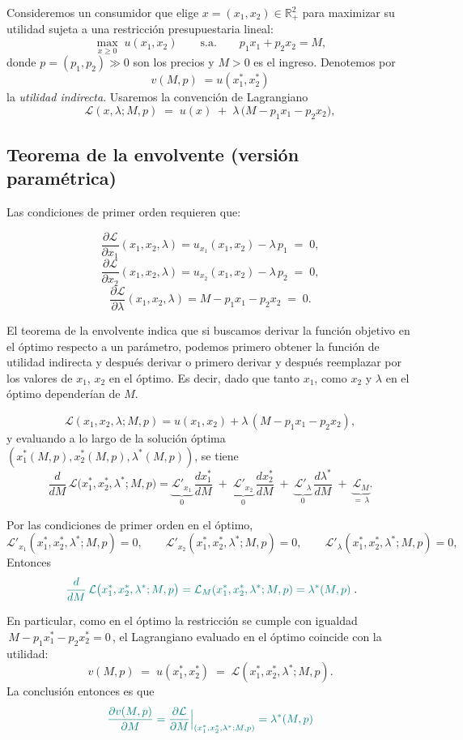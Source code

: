\documentclass{article}
\begin{document}
Consideremos un consumidor que elige \(x=(x_1,x_2)\in\mathbb{R}^2_+\) para maximizar su utilidad sujeta a una restricción presupuestaria lineal:
\[
\max_{x\ge 0}\; u(x_1,x_2)
\qquad\text{s.a.}\qquad
p_1 x_1 + p_2 x_2 = M,
\]
donde \(p=(p_1,p_2)\gg 0\) son los precios y \(M>0\) es el ingreso. Denotemos por
\[
v(M,p)\;= u(x_1^*,x_2^*)
\]
la \emph{utilidad indirecta}. Usaremos la convención de Lagrangiano
\[
\mathcal L(x,\lambda;M,p)
\;=\;
u(x)\;+\;\lambda\,\bigl(M - p_1x_1-p_2x_2),
\]

\subsection*{Teorema de la envolvente (versión paramétrica)}
Las condiciones de primer orden requieren que:

\[
\frac{\partial \mathcal L}{\partial x_1}(x_1,x_2,\lambda)
= u_{x_1}(x_1,x_2) - \lambda\,p_1 \;=\; 0,
\]
\[
\frac{\partial \mathcal L}{\partial x_2}(x_1,x_2,\lambda)
= u_{x_2}(x_1,x_2) - \lambda\,p_2 \;=\; 0,
\]
\[
\frac{\partial \mathcal L}{\partial \lambda}(x_1,x_2,\lambda)
= M - p_1 x_1 - p_2 x_2 \;=\; 0.
\]


El teorema de la envolvente indica que si buscamos derivar la función objetivo en el óptimo respecto a un parámetro, podemos primero obtener la función de utilidad indirecta y después derivar o primero derivar y después reemplazar por los valores de $x_1$, $x_2$ en el óptimo. Es decir, dado que tanto $x_1$, como $x_2$ y $\lambda$ en el óptimo dependerían de $M$.

\[
\mathcal L(x_1,x_2,\lambda;M,p)=u(x_1,x_2)+\lambda\,(M-p_1x_1-p_2x_2),
\]
y evaluando a lo largo de la solución óptima \((x_1^*(M,p),x_2^*(M,p),\lambda^*(M,p))\), se tiene
\[
\frac{d}{dM}\,\mathcal L\bigl(x_1^*,x_2^*,\lambda^*;M,p\bigr)
=
\underbrace{\mathcal L'_{x_1}}_{0}\,\frac{dx_1^*}{dM}
\;+\;
\underbrace{\mathcal L'_{x_2}}_{0}\,\frac{dx_2^*}{dM}
\;+\;
\underbrace{\mathcal L'_{\lambda}}_{0}\,\frac{d\lambda^*}{dM}
\;+\;
\underbrace{\mathcal L_{M}}_{=\,\lambda}.
\]

Por las condiciones de primer orden en el óptimo,
\[
\mathcal L'_{x_1}(x_1^*,x_2^*,\lambda^*;M,p)=0,\qquad
\mathcal L'_{x_2}(x_1^*,x_2^*,\lambda^*;M,p)=0,\qquad
\mathcal L'_{\lambda}(x_1^*,x_2^*,\lambda^*;M,p)=0,
\]
Entonces
\[
{\color{teal}\;
\frac{d}{dM}\,\mathcal L\bigl(x_1^*,x_2^*,\lambda^*;M,p\bigr)
=\mathcal L_M(x_1^*,x_2^*,\lambda^*;M,p)
=\lambda^*(M,p)\; }.
\]



En particular, como en el óptimo la restricción se cumple con igualdad
\(\,M-p_1x_1^*-p_2x_2^*=0\,\), el Lagrangiano evaluado en el óptimo coincide con la utilidad:
\[
v(M,p)\;=\;u(x_1^*,x_2^*)\;=\;\mathcal L(x_1^*,x_2^*,\lambda^*;M,p).
\]
La conclusión entonces es que
\[
{\color{teal}\;\frac{\partial v(M,p)}{\partial M}
=\frac{\partial \mathcal L}{\partial M}\Big|_{(x_1^*,x_2^*,\lambda^*;M,p)}
=\lambda^*(M,p)\;}
\]
\end{document}
